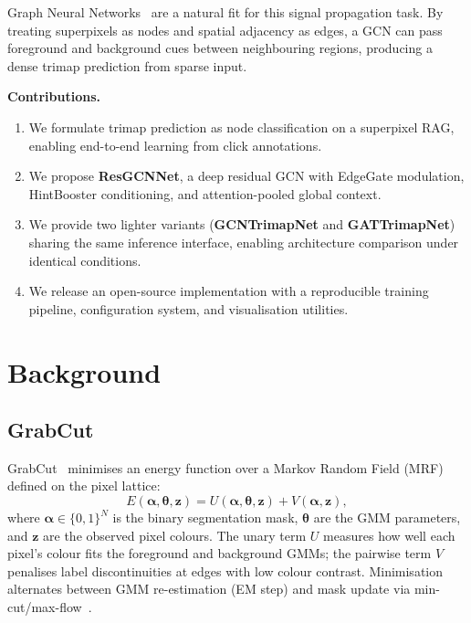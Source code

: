 \documentclass[11pt]{article}
\begin{document}
Graph Neural Networks~\cite{kipf2017semi,wu2020comprehensive} are a natural fit for this
signal propagation task.
By treating superpixels as nodes and spatial adjacency as edges, a GCN can pass foreground
and background cues between neighbouring regions, producing a dense trimap prediction from
sparse input.

\medskip
\noindent\textbf{Contributions.}
\begin{enumerate}[label=(\roman*), itemsep=2pt]
  \item We formulate trimap prediction as node classification on a superpixel RAG, enabling
        end-to-end learning from click annotations.
  \item We propose \textbf{ResGCNNet}, a deep residual GCN with EdgeGate modulation,
        HintBooster conditioning, and attention-pooled global context.
  \item We provide two lighter variants (\textbf{GCNTrimapNet} and \textbf{GATTrimapNet})
        sharing the same inference interface, enabling architecture comparison under identical
        conditions.
  \item We release an open-source implementation with a reproducible training pipeline,
        configuration system, and visualisation utilities.
\end{enumerate}

\section{Background}

\subsection{GrabCut}

GrabCut~\cite{rother2004grabcut} minimises an energy function over a Markov Random Field
(MRF) defined on the pixel lattice:
\begin{equation}
  E(\bm{\alpha}, \bm{\theta}, \mathbf{z})
  = U(\bm{\alpha}, \bm{\theta}, \mathbf{z})
  + V(\bm{\alpha}, \mathbf{z}),
\end{equation}
where $\bm{\alpha} \in \{0,1\}^N$ is the binary segmentation mask,
$\bm{\theta}$ are the GMM parameters,
and $\mathbf{z}$ are the observed pixel colours.
The unary term $U$ measures how well each pixel's colour fits the foreground and background
GMMs; the pairwise term $V$ penalises label discontinuities at edges with low colour contrast.
Minimisation alternates between GMM re-estimation (EM step) and mask update via
min-cut/max-flow~\cite{boykov2001fast}.
\end{document}
